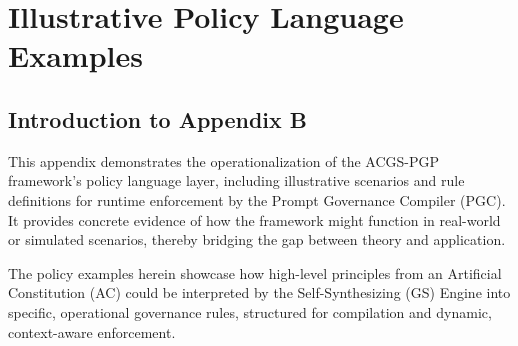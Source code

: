 \documentclass[sigconf,review,anonymous=false]{acmart} %
\begin{document}
\section{Illustrative Policy Language Examples}
\label{app:policy_examples}
\subsection{Introduction to Appendix B}
\label{app:policy_examples_intro}
This appendix demonstrates the operationalization of the ACGS-PGP framework's policy language layer, including illustrative scenarios and rule definitions for runtime enforcement by the Prompt Governance Compiler (PGC). It provides concrete evidence of how the framework might function in real-world or simulated scenarios, thereby bridging the gap between theory and application.

The policy examples herein showcase how high-level principles from an Artificial Constitution (AC) could be interpreted by the Self-Synthesizing (GS) Engine into specific, operational governance rules, structured for compilation and dynamic, context-aware enforcement.
\end{document}
